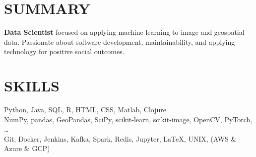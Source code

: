 \documentclass[margin,line]{resume}
\begin{document}
\begin{resume}


    \section{\mysidestyle \textbf{\large{S}\small{UMMARY}}}

    \textbf{Data Scientist} focused on applying machine learning to image and geospatial data. Passionate about software development, maintainability, and applying technology for positive social outcomes.

\sectionline
    \section{\mysidestyle \textbf{\large{S}\small{KILLS}}}

    Python, \hspace{2mm}Java, \hspace{2mm}SQL, \hspace{2mm}R, \hspace{2mm}HTML, \hspace{2mm}CSS, \hspace{2mm}Matlab, \hspace{2mm}Clojure \\
    NumPy, \hspace{2mm}pandas, \hspace{2mm}GeoPandas, \hspace{2mm}SciPy, \hspace{2mm}scikit-learn, \hspace{2mm}scikit-image, \hspace{2mm}OpenCV, \hspace{2mm}PyTorch, \ldots \\
    Git, \hspace{2mm}Docker, \hspace{2mm}Jenkins, \hspace{2mm}Kafka, \hspace{2mm}Spark, \hspace{2mm}Redis, \hspace{2mm}Jupyter, \hspace{2mm}\LaTeX, \hspace{2mm}UNIX, \hspace{2mm}(AWS \& Azure \& GCP)


\end{resume}
\end{document}
